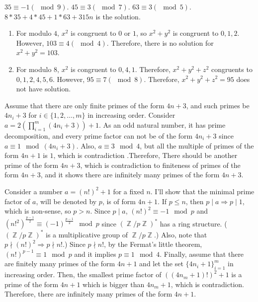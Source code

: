 \documentclass[12pt]{article}
\newenvironment{problem}[2][Problem]{\begin{trivlist}
\item[\hskip \labelsep {\bfseries #1}\hskip \labelsep {\bfseries #2.}]}{\end{trivlist}}
\DeclareMathOperator{\zz}{\mathbb{Z}}
\begin{document}
$35\equiv -1 (\mod 9)$. $45\equiv 3 (\mod 7)$. $63 \equiv 3 (\mod 5)$. $8*35+4*45+1*63+315n$ is the solution.

\begin{problem}{4}
\end{problem}
\begin{enumerate}
\item[(i)] For modulo $4$, $x^2$ is congruent to $0$ or $1$, so $x^2+y^2$ is congruent to $0,1,2$. However, $103\equiv 4 (\mod 4)$. Therefore, there is no solution for $x^2+y^2=103$.
\item[(ii)] For modulo $8$, $x^2$ is congruent to $0, 4, 1$. Therefore, $x^2+y^2+z^2$ congruents to $0, 1, 2, 4, 5, 6$. However, $95\equiv 7 (\mod 8)$. Therefore, $x^2+y^2+z^2=95$ does not have solution.
\end{enumerate}
\begin{problem}{5}
\end{problem}
Assume that there are only finite primes of the form $4n+3$, and such primes be $4n_i+3$ for $i\in \{1, 2, \ldots, m\}$ in increasing order. Consider $a=2\left(\prod_{i=1}^m (4n_i+3)\right)+1$. As an odd natural number, it has prime decomposition, and every prime factor can not be of the form $4n_i+3$ since $a \equiv 1\mod (4n_i+3)$. Also, $a \equiv 3\mod 4$, but all the multiple of primes of the form $4n+1$ is $1$, which is contradiction .Therefore, There should be another prime of the form $4n+3$, which is contradiction to finiteness of primes of the form $4n+3$, and it shows there are infinitely many primes of the form $4n+3$.




\begin{problem}{6}
\end{problem}
Consider a number $a=(n!)^2+1$ for a fixed $n$. I'll show that the minimal prime factor of $a$, will be denoted by $p$, is of form $4n+1$. If $p\leq n$, then $p\mid a\Rightarrow p\mid 1$, which is non-sense, so $p>n$. Since $p\mid a$, $(n!)^2\equiv -1\mod p$ and $(n!^2)^{\frac{p-1}{2}}\equiv (-1)^{\frac{p-1}{2}} \mod p$ since $(\zz/p\zz)^*$ has a ring structure. ($(\zz/p\zz)^*$ is a multiplicative group of $\zz/p\zz$.) Also, note that $p\nmid (n!)^2\Rightarrow p\nmid n!$.) Since $p\nmid n!$, by the Fermat's little theorem, $(n!)^{p-1}\equiv 1 \mod p$ and it implies $p \equiv 1 \mod 4$.
Finally, assume that there are finitely many primes of the form $4n+1$ and let the set $\{4n_i+1\}_{i=1}^m$ in increasing order. Then, the smallest prime factor of $((4n_m+1)!)^2+1$ is a prime of the form $4n+1$ which is bigger than $4n_m+1$, which is contradiction. Therefore, there are infinitely many primes of the form $4n+1$.
\end{document}
